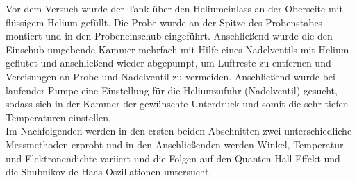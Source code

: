 Vor dem Versuch wurde der Tank über den Heliumeinlass an der Oberseite mit flüssigem Helium gefüllt. Die Probe wurde an der Spitze des Probenstabes montiert und in den Probeneinschub eingeführt. Anschließend wurde die den Einschub umgebende Kammer mehrfach mit Hilfe eines Nadelventils mit Helium geflutet und anschließend wieder abgepumpt, um Luftreste zu entfernen und Vereisungen an Probe und Nadelventil zu vermeiden. Anschließend wurde bei laufender Pumpe eine Einstellung für die Heliumzufuhr (Nadelventil) gesucht, sodass sich in der Kammer der gewünschte Unterdruck und somit die sehr tiefen Temperaturen einstellen.\\

Im Nachfolgenden werden in den ersten beiden Abschnitten zwei unterschiedliche Messmethoden erprobt und in den Anschließenden werden Winkel, Temperatur und Elektronendichte variiert und die Folgen auf den Quanten-Hall Effekt und die Shubnikov-de Haas Oszillationen untersucht.